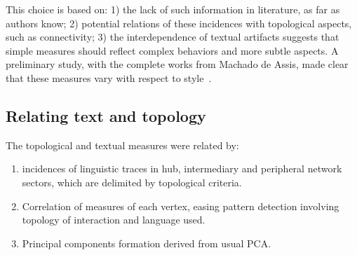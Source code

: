 \documentclass[%
 aip,
 jmp,%
 amsmath,amssymb,
 reprint,%
]{revtex4-1}
\begin{document}
This choice is based on: 1) the lack of such information in literature, as far as authors know; 
2) potential relations of these incidences with topological aspects, such as connectivity; 3) the interdependence of textual artifacts suggests that simple measures should reflect complex behaviors and more subtle aspects.
A preliminary study, with the complete works from Machado de Assis, made clear that these measures vary with respect to style~\cite{letrasMachado}.

%
\subsection{Relating text and topology}\label{sec:ks}
The topological and textual measures were related by:
\begin{enumerate}
    \item incidences of linguistic traces in hub, intermediary and peripheral network sectors, which are delimited by topological criteria.
    \item Correlation of measures of each vertex, easing pattern detection involving topology of interaction and language used.
    \item Principal components formation derived from usual PCA.
\end{enumerate}
\end{document}
